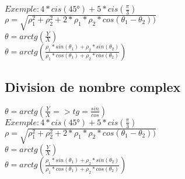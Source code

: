 $ Exemple : 4*cis(45°) + 5*cis(\frac{\pi}{3})$\\

$\rho = \sqrt{\rho_1^{2}+\rho_2^{2} + 2 * \rho_1 * \rho_2 * cos(\theta_1-\theta_2))}$ \\

$\theta = arctg(\frac{Y}{X})$\\

$\theta = arctg(\frac{\rho_1 * sin(\theta_1) + \rho_2 * sin(\theta_2)} {\rho_1 * cos(\theta_1) + \rho_2 * cos(\theta_2)})$ \\


\vspace{4mm} %
\subsection{Division de nombre complex}

$\theta = arctg(\frac{Y}{X} => tg = \frac{sin}{cos} )$ \\

$ Exemple : 4*cis(45°) + 5*cis(\frac{\pi}{3})$\\

$\rho = \sqrt{\rho_1^{2}+\rho_2^{2} + 2 * \rho_1 * \rho_2 * cos(\theta_1-\theta_2))}$ \\

$\theta = arctg(\frac{Y}{X})$\\

$\theta = arctg(\frac{\rho_1 * sin(\theta_1) + \rho_2 * sin(\theta_2)} {\rho_1 * cos(\theta_1) + \rho_2 * cos(\theta_2)})$ \\
